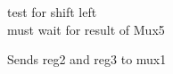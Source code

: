 test for shift left ~\newline
~\newline
~\newline
~\newline
~\newline
~\newline
~\newline
~\newline
~\newline
~\newline
~\newline
~\newline
~\newline
~\newline
~\newline
~\newline
~\newline
~\newline
~\newline
~\newline
~\newline
~\newline
~\newline
~\newline
~\newline
~\newline
~\newline
~\newline
~\newline
~\newline
~\newline
~\newline
 must wait for result of Mux5

Sends reg2 and reg3 to mux1

